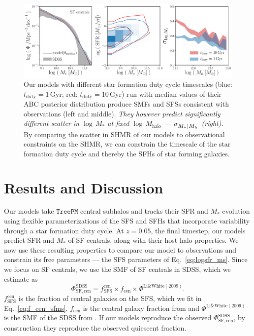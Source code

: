 \documentclass[12pt, letterpaper, preprint, tighten]{aastex62}
\newcommand{\beq}{\begin{equation}}
\newcommand{\eeq}{\end{equation}}
\newcommand{\siglogm}{\sigma_{\scaleto{M_*|M_h}{8pt}}}
\begin{document}
\begin{figure}
\begin{center}
\includegraphics[width=\textwidth]{figs/qaplot_abc.pdf}
    \caption{Our models with different star formation duty cycle timescales
    (blue: $t_\mathrm{duty}{=}1\,\mathrm{Gyr}$; red: $t_\mathrm{duty}{=}10\,\mathrm{Gyr}$)
    run with median values of their ABC posterior distribution produce SMFs and SFSs consistent
    with observations (left and middle). \emph{They however predict significantly different
    scatter in $\log\,M_*$ at fixed $\log\,M_\mathrm{halo}$ --- $\siglogm$ (right)}.
    By comparing the scatter in SHMR of our models to observational constraints on the SHMR,
    we can constrain the timescale of the star formation duty cycle and thereby the SFHs of star
    forming galaxies.
    }
\label{fig:abc_demo}
\end{center}
\end{figure}

\section{Results and Discussion} \label{sec:results}
Our models take $\mathtt{TreePM}$ central subhalos and tracks their SFR
and $M_*$ evolution using flexible parameterizations of the SFS and SFHs
that incorporate variability through a star formation duty cycle.
At $z = 0.05$, the final timestep, our models predict SFR and $M_*$ of SF
centrals, along with their host halo properties. We now use these resulting
properties to compare our model to observations and constrain its free
parameters --- the SFS parameters of Eq.~\ref{eq:logsfr_ms}. Since we focus
on SF centrals, we use the SMF of SF centrals in SDSS, which we estimate as
\beq \label{eq:smf_sf_cen}
\Phi^\mathrm{SDSS}_\mathrm{SF,cen} = f^\mathrm{cen}_\mathrm{SFS} \times f_\mathrm{cen} \times \Phi^\mathrm{Li\&White(2009)}.
\eeq
$f^\mathrm{cen}_\mathrm{SFS}$ is the fraction of central galaxies on the
SFS, which we fit in Eq.~\ref{eq:f_cen_sfms}. $f_\mathrm{cen}$ is the
central galaxy fraction from \cite{wetzel2013} and $\Phi^\mathrm{Li\&White(2009)}$
is the SMF of the SDSS from \cite{li2009}. If our models reproduce the
observed $\Phi^\mathrm{SDSS}_\mathrm{SF,cen}$, by construction they reproduce
the observed quiescent fraction.
\end{document}
